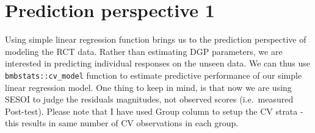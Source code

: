 \documentclass[
]{book}
\begin{document}
\hypertarget{prediction-perspective-1}{%
\section{Prediction perspective 1}\label{prediction-perspective-1}}

Using simple linear regression function brings us to the prediction perspective of modeling the RCT data. Rather than estimating DGP parameters, we are interested in predicting individual responses on the unseen data. We can thus use \texttt{bmbstats::cv\_model} function to estimate predictive performance of our simple linear regression model. One thing to keep in mind, is that now we are using SESOI to judge the residuals magnitudes, not observed scores (i.e.~measured Post-test). Please note that I have used Group column to setup the CV strata - this results in same number of CV observations in each group.
\end{document}
